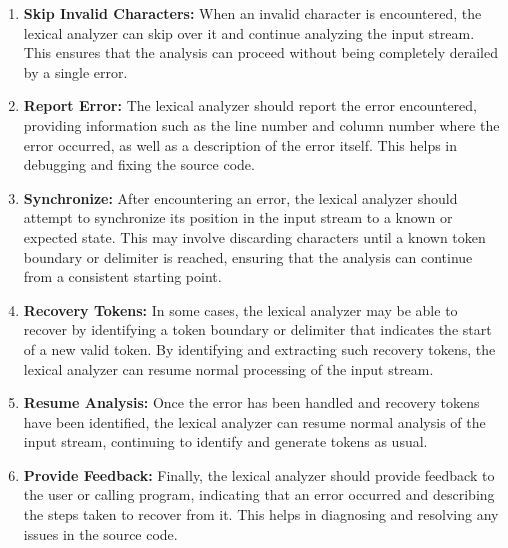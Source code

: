 \documentclass{article}
\begin{document}
\begin{enumerate}
    \item \textbf{Skip Invalid Characters:} When an invalid character is encountered, the lexical analyzer can skip over it and continue analyzing the input stream. This ensures that the analysis can proceed without being completely derailed by a single error.
    
    \item \textbf{Report Error:} The lexical analyzer should report the error encountered, providing information such as the line number and column number where the error occurred, as well as a description of the error itself. This helps in debugging and fixing the source code.
    
    \item \textbf{Synchronize:} After encountering an error, the lexical analyzer should attempt to synchronize its position in the input stream to a known or expected state. This may involve discarding characters until a known token boundary or delimiter is reached, ensuring that the analysis can continue from a consistent starting point.
    
    \item \textbf{Recovery Tokens:} In some cases, the lexical analyzer may be able to recover by identifying a token boundary or delimiter that indicates the start of a new valid token. By identifying and extracting such recovery tokens, the lexical analyzer can resume normal processing of the input stream.
    
    \item \textbf{Resume Analysis:} Once the error has been handled and recovery tokens have been identified, the lexical analyzer can resume normal analysis of the input stream, continuing to identify and generate tokens as usual.
    
    \item \textbf{Provide Feedback:} Finally, the lexical analyzer should provide feedback to the user or calling program, indicating that an error occurred and describing the steps taken to recover from it. This helps in diagnosing and resolving any issues in the source code.
\end{enumerate}
\end{document}

